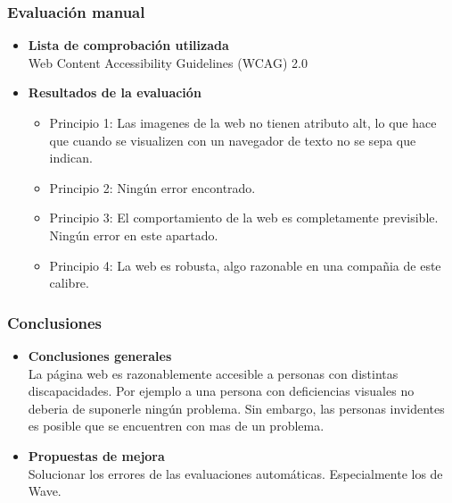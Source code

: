 \documentclass[a4paper,11pt]{article}
\begin{document}
\subsubsection{Evaluación manual}
\begin{itemize}
  \item \textbf{Lista de comprobación utilizada}\\
  Web Content Accessibility Guidelines (WCAG) 2.0
  \item \textbf{Resultados de la evaluación}
  \begin{itemize}
    \item Principio 1: Las imagenes de la web no tienen atributo alt, lo que hace que cuando se visualizen con un navegador de texto no se sepa que indican.
    \item Principio 2: Ningún error encontrado.
    \item Principio 3: El comportamiento de la web es completamente previsible. Ningún error en este apartado.
    \item Principio 4: La web es robusta, algo razonable en una compañia de este calibre.
  \end{itemize}


\end{itemize}

\subsubsection{Conclusiones}
\begin{itemize}
  \item \textbf{Conclusiones generales}\\
  La página web es razonablemente accesible a personas con distintas discapacidades. Por ejemplo a una persona con deficiencias visuales no deberia de suponerle ningún problema. Sin embargo, las personas invidentes es posible que se encuentren con mas de un problema.
  \item \textbf{Propuestas de mejora}\\
  Solucionar los errores de las evaluaciones automáticas. Especialmente los de Wave.
\end{itemize}
\end{document}
